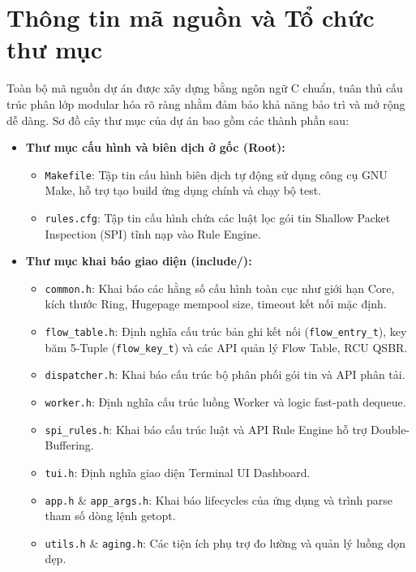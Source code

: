 \documentclass[12pt,a4paper,twoside]{report}
\begin{document}
\section{Thông tin mã nguồn và Tổ chức thư mục}
Toàn bộ mã nguồn dự án được xây dựng bằng ngôn ngữ C chuẩn, tuân thủ cấu trúc phân lớp modular hóa rõ ràng nhằm đảm bảo khả năng bảo trì và mở rộng dễ dàng. Sơ đồ cây thư mục của dự án bao gồm các thành phần sau:

\begin{flushleft}
\begin{itemize}
    \item \textbf{Thư mục cấu hình và biên dịch ở gốc (Root):}
    \begin{itemize}
        \item \texttt{Makefile}: Tập tin cấu hình biên dịch tự động sử dụng công cụ GNU Make, hỗ trợ tạo build ứng dụng chính và chạy bộ test.
        \item \texttt{rules.cfg}: Tập tin cấu hình chứa các luật lọc gói tin Shallow Packet Inspection (SPI) tĩnh nạp vào Rule Engine.
    \end{itemize}
    \item \textbf{Thư mục khai báo giao diện (include/):}
    \begin{itemize}
        \item \texttt{common.h}: Khai báo các hằng số cấu hình toàn cục như giới hạn Core, kích thước Ring, Hugepage mempool size, timeout kết nối mặc định.
        \item \texttt{flow\_table.h}: Định nghĩa cấu trúc bản ghi kết nối (\texttt{flow\_entry\_t}), key băm 5-Tuple (\texttt{flow\_key\_t}) và các API quản lý Flow Table, RCU QSBR.
        \item \texttt{dispatcher.h}: Khai báo cấu trúc bộ phân phối gói tin và API phân tải.
        \item \texttt{worker.h}: Định nghĩa cấu trúc luồng Worker và logic fast-path dequeue.
        \item \texttt{spi\_rules.h}: Khai báo cấu trúc luật và API Rule Engine hỗ trợ Double-Buffering.
        \item \texttt{tui.h}: Định nghĩa giao diện Terminal UI Dashboard.
        \item \texttt{app.h} \& \texttt{app\_args.h}: Khai báo lifecycles của ứng dụng và trình parse tham số dòng lệnh getopt.
        \item \texttt{utils.h} \& \texttt{aging.h}: Các tiện ích phụ trợ đo lường và quản lý luồng dọn dẹp.
    \end{itemize}

\end{itemize}
\end{flushleft}
\end{document}
